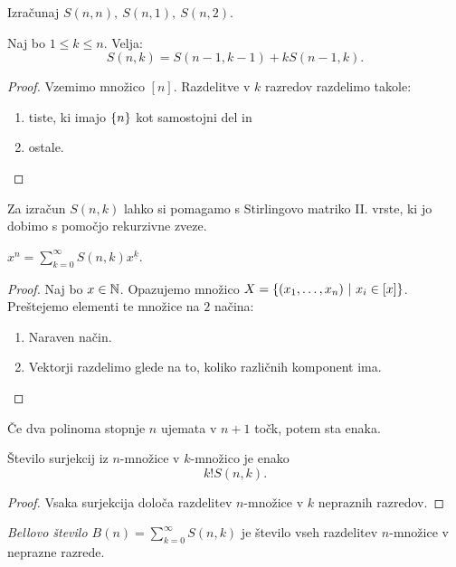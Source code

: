 \begin{primer}
    Izračunaj $S(n, n), \ S(n, 1), \ S(n,2)$.
\end{primer}

\begin{trditev}
    Naj bo $1 \leq k \leq n$. Velja:
    $$S(n,k) = S(n-1, k-1) + k S(n-1, k).$$
\end{trditev}

\begin{proof}
    Vzemimo množico $[n]$. Razdelitve v $k$ razredov razdelimo takole:
    \begin{enumerate}
        \item tiste, ki imajo $\left\{n\right\}$ kot samostojni del in
        \item ostale. \qedhere
    \end{enumerate}
\end{proof}

Za izračun $S(n,k)$ lahko si pomagamo s Stirlingovo matriko II. vrste, ki jo dobimo s pomočjo rekurzivne zveze.

\begin{trditev}
    $x^n=\sum_{k=0}^{\infty} S(n,k) x^{\underline{k}}$.
\end{trditev}

\begin{proof}
    Naj bo \(x \in \mathbb{N}\). Opazujemo množico \(X = \left\{(x_1, \ldots, x_n) \ | \ x_i \in [x]\right\}\). Preštejemo elementi te množice na \(2\) načina:
    \begin{enumerate}
        \item Naraven način.
        \item Vektorji razdelimo glede na to, koliko različnih komponent ima. \qedhere
    \end{enumerate}
\end{proof}

\begin{opomba}
    Če dva polinoma stopnje $n$ ujemata v $n+1$ točk, potem sta enaka.
\end{opomba}

\begin{izrek}
    Število surjekcij iz $n$-množice v $k$-množico je enako 
    $$k! S(n,k).$$
\end{izrek}

\begin{proof}
    Vsaka surjekcija določa razdelitev $n$-množice v $k$ nepraznih razredov.
\end{proof}

\begin{definicija}
    \emph{Bellovo število $B(n) = \sum_{k=0}^{\infty} S(n,k)$} je število vseh razdelitev $n$-množice v neprazne razrede.
\end{definicija}

